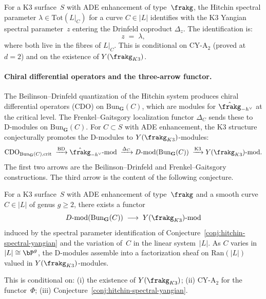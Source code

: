 \begin{conjecture}[Hitchin spectral parameter = K3 Yangian parameter]
\label{conj:hitchin-spectral-yangian}
\ClaimStatusConjectured
For a K3 surface~$S$ with ADE enhancement of type~$\frakg$, the Hitchin spectral parameter $\lambda \in \mathrm{Tot}(L|_C)$ for a curve $C \in |L|$ identifies with the K3 Yangian spectral parameter~$z$ entering the Drinfeld coproduct $\Delta_z$. The identification is:
\[
 z \;=\; \lambda,
\]
where both live in the fibres of $L|_C$. This is conditional on CY-A$_2$ (proved at $d = 2$) and on the existence of $Y(\frakg_{K3})$.
\end{conjecture}

\paragraph{Chiral differential operators and the three-arrow functor.}
The Beilinson--Drinfeld quantization of the Hitchin system produces chiral differential operators (CDO) on $\mathrm{Bun}_\mathbf{G}(C)$, which are modules for $\hat{\frakg}_{-h^\vee}$ at the critical level. The Frenkel--Gaitsgory localization functor $\Delta_C$ sends these to D-modules on $\mathrm{Bun}_\mathbf{G}(C)$. For $C \subset S$ with ADE enhancement, the K3 structure conjecturally promotes the D-modules to $Y(\frakg_{K3})$-modules:
\[
 \mathrm{CDO}_{\mathrm{Bun}_\mathbf{G}(C), \mathrm{crit}}
 \;\xrightarrow{\text{BD}}{}
 \hat{\frakg}_{-h^\vee}\text{-mod}
 \;\xrightarrow{\Delta_C}{}
 D\text{-mod}(\mathrm{Bun}_\mathbf{G}(C))
 \;\xrightarrow{\text{K3}}{}
 Y(\frakg_{K3})\text{-mod}.
\]
The first two arrows are the Beilinson--Drinfeld and Frenkel--Gaitsgory constructions. The third arrow is the content of the following conjecture.

\begin{conjecture}
\label{conj:hitchin-yangian-module}
\ClaimStatusConjectured
For a K3 surface~$S$ with ADE enhancement of type~$\frakg$ and a smooth curve $C \in |L|$ of genus $g \geq 2$, there exists a functor
\[
 D\text{-mod}(\mathrm{Bun}_\mathbf{G}(C)) \;\longrightarrow\; Y(\frakg_{K3})\text{-mod}
\]
induced by the spectral parameter identification of Conjecture~\ref{conj:hitchin-spectral-yangian} and the variation of~$C$ in the linear system~$|L|$. As $C$ varies in $|L| \cong \bP^g$, the D-modules assemble into a factorization sheaf on $\mathrm{Ran}(|L|)$ valued in $Y(\frakg_{K3})$-modules.

This is conditional on: (i) the existence of $Y(\frakg_{K3})$; (ii) CY-A$_2$ for the functor~$\Phi$; (iii) Conjecture~\ref{conj:hitchin-spectral-yangian}.
\end{conjecture}


